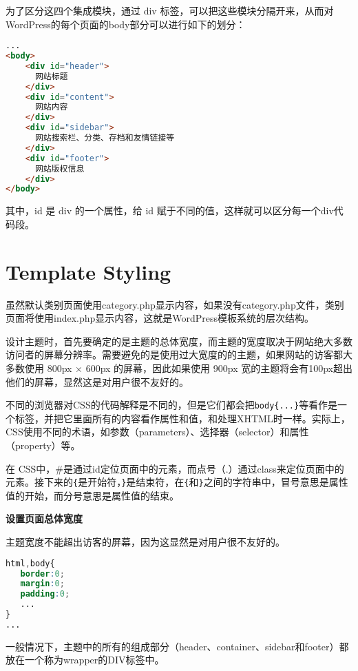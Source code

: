 为了区分这四个集成模块，通过 div 标签，可以把这些模块分隔开来，从而对WordPress的每个页面的body部分可以进行如下的划分：

\begin{lstlisting}[language=HTML]
...
<body>
    <div id="header">
      网站标题
    </div>
    <div id="content">
      网站内容
    </div>
    <div id="sidebar">
      网站搜索栏、分类、存档和友情链接等
    </div>
    <div id="footer">
      网站版权信息
    </div>
</body>
\end{lstlisting}


其中，id 是 div 的一个属性，给 id 赋于不同的值，这样就可以区分每一个div代码段。








\section{Template Styling}


虽然默认类别页面使用category.php显示内容，如果没有category.php文件，类别页面将使用index.php显示内容，这就是WordPress模板系统的层次结构。


设计主题时，首先要确定的是主题的总体宽度，而主题的宽度取决于网站绝大多数访问者的屏幕分辨率。需要避免的是使用过大宽度的的主题，如果网站的访客都大多数使用 800px × 600px 的屏幕，因此如果使用 900px 宽的主题将会有100px超出他们的屏幕，显然这是对用户很不友好的。

不同的浏览器对CSS的代码解释是不同的，但是它们都会把\texttt{body\{...\}}等看作是一个标签，并把它里面所有的内容看作属性和值，和处理XHTML时一样。实际上，CSS使用不同的术语，如参数（parameters）、选择器（selector）和属性（property）等。



在 CSS中，\#是通过id定位页面中的元素，而点号（.）通过class来定位页面中的元素。接下来的\texttt{\{}是开始符，\texttt{\}}是结束符，在\texttt{\{}和\texttt{\}}之间的字符串中，冒号意思是属性值的开始，而分号意思是属性值的结束。

\textbf{设置页面总体宽度}

主题宽度不能超出访客的屏幕，因为这显然是对用户很不友好的。

\begin{lstlisting}[language=CSS]
html,body{
   border:0;
   margin:0;
   padding:0;
   ...
}
...
\end{lstlisting}


一般情况下，主题中的所有的组成部分（header、container、sidebar和footer）都放在一个称为wrapper的DIV标签中。

